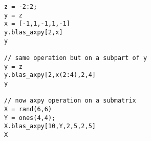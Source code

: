 \begin{examples}
\begin{Verbatim}
z = -2:2;
y = z
x = [-1,1,-1,1,-1]
y.blas_axpy[2,x]
y 

// same operation but on a subpart of y
y = z
y.blas_axpy[2,x(2:4),2,4]
y

// now axpy operation on a submatrix
X = rand(6,6)
Y = ones(4,4);
X.blas_axpy[10,Y,2,5,2,5]
X
\end{Verbatim}

\end{examples}

\begin{manseealso}
\end{manseealso}

